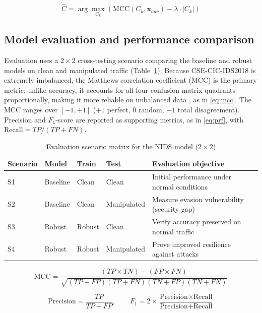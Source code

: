 \documentclass{iaesarticle}
\begin{document}
\begin{equation}\label{eq:sweetspot}
\hat{C} = \arg\max_{C_k} \left( \text{MCC}(C_k, \mathbf{x}_{adv}) - \lambda \cdot |C_k| \right)
\end{equation}

\subsection{Model evaluation and performance comparison}
Evaluation uses a $2\times2$ cross-testing scenario comparing the baseline and robust models on clean and manipulated traffic (Table~\ref{tab:scenario_2x2}). Because CSE-CIC-IDS2018 is extremely imbalanced, the Matthews correlation coefficient (MCC) \cite{53} is the primary metric; unlike accuracy, it accounts for all four confusion-matrix quadrants proportionally, making it more reliable on imbalanced data \cite{54}, as in \eqref{eq:mcc}. The MCC ranges over $[-1,+1]$ ($+1$ perfect, $0$ random, $-1$ total disagreement). Precision and $F_1$-score are reported as supporting metrics, as in \eqref{eq:prf}, with $\text{Recall}=TP/(TP+FN)$.

\begin{table}[H]
\centering
\fontsize{8pt}{10pt}\selectfont
\caption{Evaluation scenario matrix for the NIDS model ($2\times2$)}
\label{tab:scenario_2x2}
\begin{tabular}{l l l l p{5.2cm}}
\hline
\textbf{Scenario} & \textbf{Model} & \textbf{Train} & \textbf{Test} & \textbf{Evaluation objective} \\ \hline
S1 & Baseline & Clean  & Clean       & Initial performance under normal conditions \\
S2 & Baseline & Clean  & Manipulated & Measure evasion vulnerability (security gap) \\
S3 & Robust   & Robust & Clean       & Verify accuracy preserved on normal traffic \\
S4 & Robust   & Robust & Manipulated & Prove improved resilience against attacks \\ \hline
\end{tabular}
\end{table}

\begin{equation}\label{eq:mcc}
\text{MCC} = \frac{(TP \times TN) - (FP \times FN)}{\sqrt{(TP + FP)(TP + FN)(TN + FP)(TN + FN)}}
\end{equation}

\begin{equation}\label{eq:prf}
\text{Precision} = \frac{TP}{TP + FP}, \qquad F_1 = 2 \times \frac{\text{Precision} \times \text{Recall}}{\text{Precision} + \text{Recall}}
\end{equation}
\end{document}
